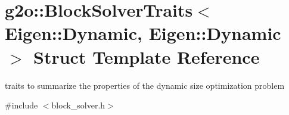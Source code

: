 \hypertarget{structg2o_1_1BlockSolverTraits_3_01Eigen_1_1Dynamic_00_01Eigen_1_1Dynamic_01_4}{}\section{g2o\+:\+:Block\+Solver\+Traits$<$ Eigen\+:\+:Dynamic, Eigen\+:\+:Dynamic $>$ Struct Template Reference}
\label{structg2o_1_1BlockSolverTraits_3_01Eigen_1_1Dynamic_00_01Eigen_1_1Dynamic_01_4}


traits to summarize the properties of the dynamic size optimization problem  




{\ttfamily \#include $<$block\+\_\+solver.\+h$>$}

